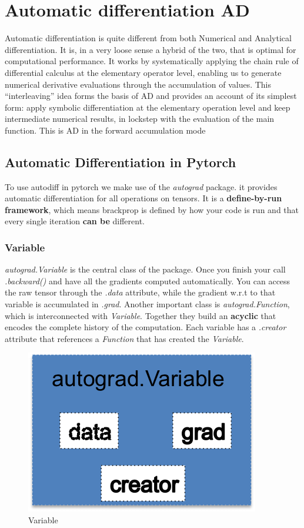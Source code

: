 \documentclass[]{report}
\begin{document}
\section{Automatic differentiation AD}
Automatic differentiation is quite different from both Numerical and Analytical differentiation. It is, in a very loose sense a hybrid of the two, that is optimal for computational performance. It works by systematically applying the chain rule of differential calculus at the elementary operator level, enabling us to generate numerical derivative evaluations through the accumulation of values.   
This “interleaving” idea forms the basis of AD and provides an account of
its simplest form: apply symbolic differentiation at the elementary operation
level and keep intermediate numerical results, in lockstep with the evaluation
of the main function. This is AD in the forward accumulation mode

\subsection{Automatic Differentiation in Pytorch}
To use autodiff in pytorch we make use of the \textit{autograd} package. it provides automatic differentiation for all operations on tensors. It is a \textbf{define-by-run framework}, which means brackprop is defined by how your code is run and that every single iteration \textbf{can be} different. 

\subsubsection{Variable}

\textit{autograd.Variable} is the central class of the package. Once you finish your call \textit{.backward()} and have all the gradients computed automatically. You can access the raw tensor through the \textit{.data} attribute, while the gradient w.r.t to that variable is accumulated in \textit{.grad}. 
Another important class is \textit{autograd.Function}, which is interconnected with \textit{Variable}. Together they build an \textbf{acyclic} that encodes the complete history of the computation. Each variable has a \textit{.creator} attribute that references a \textit{Function} that has created the \textit{Variable}.  
\begin{figure}[!]
\centering
\includegraphics{../Pytorch_learning/autograd}\caption{Variable}
\end{figure}
\end{document}
